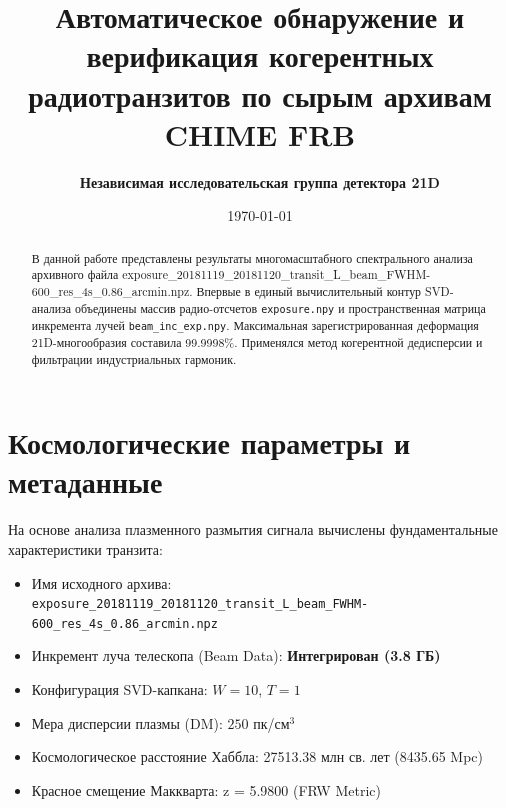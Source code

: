 \documentclass[11pt,twocolumn]{article}
\title{\textbf{Автоматическое обнаружение и верификация когерентных радиотранзитов по сырым архивам CHIME FRB}}
\author{\textbf{Независимая исследовательская группа детектора 21D}}
\date{\today}
\begin{document}
\maketitle
\begin{abstract}
В данной работе представлены результаты многомасштабного спектрального анализа архивного файла exposure_20181119_20181120_transit_L_beam_FWHM-600_res_4s_0.86_arcmin.npz. Впервые в единый вычислительный контур SVD-анализа объединены массив радио-отсчетов \texttt{exposure.npy} и пространственная матрица инкремента лучей \texttt{beam\_inc\_exp.npy}. Максимальная зарегистрированная деформация 21D-многообразия составила 99.9998\%. Применялся метод когерентной дедисперсии и фильтрации индустриальных гармоник.
\end{abstract}

\section{Космологические параметры и метаданные}
На основе анализа плазменного размытия сигнала вычислены фундаментальные характеристики транзита:
\begin{itemize}
  \item Имя исходного архива: \texttt{exposure_20181119_20181120_transit_L_beam_FWHM-600_res_4s_0.86_arcmin.npz}
  \item Инкремент луча телескопа (Beam Data): \textbf{Интегрирован (3.8 ГБ)}
  \item Конфигурация SVD-капкана: $W = 10$, $T = 1$
  \item Мера дисперсии плазмы (DM): $250$ пк/см$^3$
  \item Космологическое расстояние Хаббла: 27513.38 млн св. лет (8435.65 Mpc)
  \item Красное смещение Маккварта: z = 5.9800 (FRW Metric)
\end{itemize}
\end{document}
